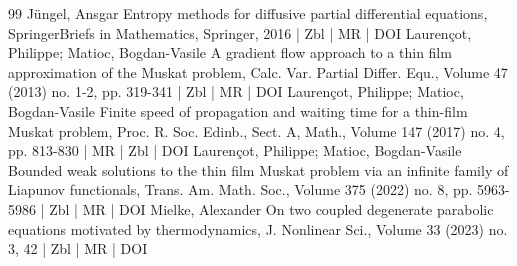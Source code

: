 \documentclass[10pt]{amsart}
\theoremstyle{definition}\newtheorem{defi}[theo]{Definition}\newtheorem{rema}[theo]{Remark}\newtheorem{exam}[theo]{Example}\newtheorem{exem}[theo]{Example}\newtheorem{nota}[theo]{Notation}
\begin{document}
\begin{thebibliography}{99}
Jüngel, Ansgar Entropy methods for diffusive partial differential equations, SpringerBriefs in Mathematics, Springer, 2016 | Zbl | MR | DOI
Laurençot, Philippe; Matioc, Bogdan-Vasile A gradient flow approach to a thin film approximation of the Muskat problem, Calc. Var. Partial Differ. Equ., Volume 47 (2013) no. 1-2, pp. 319-341 | Zbl | MR | DOI
Laurençot, Philippe; Matioc, Bogdan-Vasile Finite speed of propagation and waiting time for a thin-film Muskat problem, Proc. R. Soc. Edinb., Sect. A, Math., Volume 147 (2017) no. 4, pp. 813-830 | MR | Zbl | DOI
Laurençot, Philippe; Matioc, Bogdan-Vasile Bounded weak solutions to the thin film Muskat problem via an infinite family of Liapunov functionals, Trans. Am. Math. Soc., Volume 375 (2022) no. 8, pp. 5963-5986 | Zbl | MR | DOI
Mielke, Alexander On two coupled degenerate parabolic equations motivated by thermodynamics, J. Nonlinear Sci., Volume 33 (2023) no. 3, 42 | Zbl | MR | DOI
\end{thebibliography}
\end{document}
